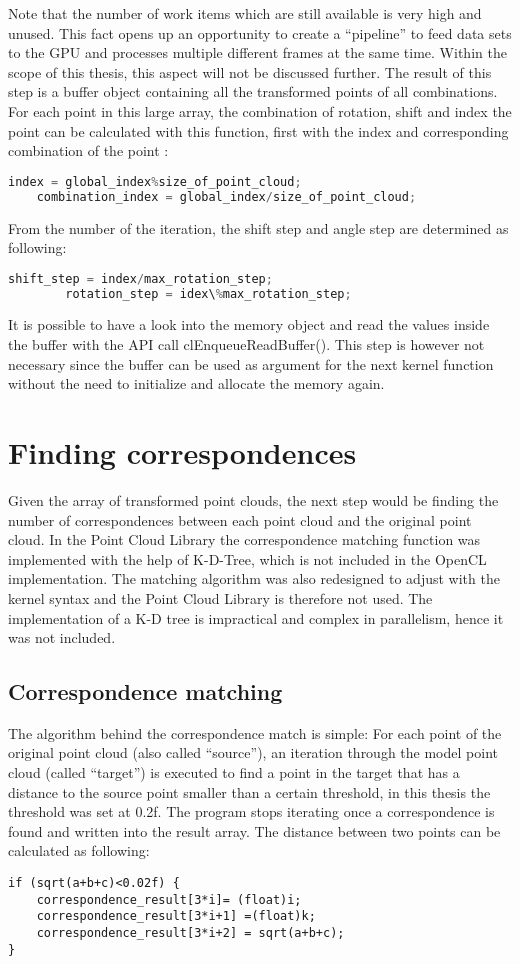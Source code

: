 Note that the number of work items which are still available is very high and unused. This fact opens up an opportunity to create a “pipeline” to feed data sets  to the GPU and processes multiple different frames at the same time. Within the scope of this thesis, this aspect will not be discussed further. 
The result of this step is a buffer object containing all the transformed points of all combinations. For each point in this large array, the combination  of rotation, shift and index the point can be calculated with this function, first with the index and corresponding combination of the point  :
\begin{lstlisting}[language=C]
 	index = global_index%size_of_point_cloud;
 	combination_index = global_index/size_of_point_cloud;
\end{lstlisting}


From the number of the iteration, the shift step and angle step are determined as following:
\begin{lstlisting}[language=C]
	shift_step = index/max_rotation_step;
    	rotation_step = idex\%max_rotation_step;    
\end{lstlisting}    

    
It is possible to have a look into the memory object and read the values inside the buffer with the API call clEnqueueReadBuffer(). This step is however not necessary since the buffer can be used as argument for the next kernel function without the need to initialize and allocate the memory again. 
\newpage
\section{Finding correspondences}
Given the array of transformed point clouds, the next step would be finding the number of correspondences between each point cloud and the original point cloud. In the Point Cloud Library the correspondence matching function was implemented with the help of K-D-Tree, which is not included in the OpenCL implementation. The matching algorithm was also redesigned to adjust with the kernel syntax and the Point Cloud Library is therefore not used. The implementation of a K-D tree is impractical and complex in parallelism, hence it was not included.
\subsection{Correspondence matching}
The algorithm behind the correspondence match is simple: For each point of the original point cloud (also called “source”), an iteration through the model point cloud (called “target”) is executed to find a point in the target that has a distance to the source point smaller than a certain threshold, in this thesis the threshold was set at 0.2f. The program stops iterating once a correspondence is found and written into the result array. The distance between two points can be calculated as following:
\begin{lstlisting}
if (sqrt(a+b+c)<0.02f) {       
    correspondence_result[3*i]= (float)i;
    correspondence_result[3*i+1] =(float)k;
    correspondence_result[3*i+2] = sqrt(a+b+c);
}
   
\end{lstlisting}  

